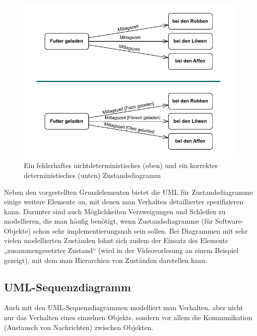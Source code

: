 \begin{figure}[t]
	\vspace{5mm} %
	\centering
	\includegraphics[scale=1.0]{Bilder/Kapitel-5/zustandsdiagramme.pdf}
	\caption[Ein fehlerhaftes nichtdeterministisches und ein korrektes deterministisches Zustandsdiagramm]{Ein fehlerhaftes nichtdeterministisches (oben) und ein korrektes deter\-ministisches (unten) Zustandsdiagramm}
	\label{fig:zustandsdiagramme}
	\vspace{\baselineskip} %
\end{figure}


\vspace{0.9mm} %

Neben den vorgestellten Grundelementen bietet die UML für Zustandsdiagramme einige weitere Elemente an, mit denen man Verhalten detaillierter spezifizieren kann. Darunter sind auch Möglichkeiten Verzweigungen und Schleifen zu modellieren, die man häufig benötigt, wenn Zustandsdiagramme (für Software-Objekte) schon sehr implementierungsnah sein sollen. Bei Diagrammen mit sehr vielen modellierten Zuständen lohnt sich zudem der Einsatz des Elements „zusammengesetzter Zustand“ (wird in der Videovorlesung an einem Beispiel gezeigt), mit dem man Hierarchien von Zuständen darstellen kann.

\subsection*{UML-Sequenzdiagramm}

Auch mit den UML-Sequenzdiagrammen modelliert man Verhalten, aber nicht nur das Verhalten eines einzelnen Objekts, sondern vor allem die Kommunikation (Austausch von Nachrichten) zwischen Objekten. 

